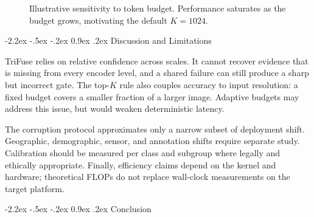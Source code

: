 \documentclass[10pt,twocolumn,letterpaper]{article}
\makeatletter
\newcommand{\method}{TriFuse}
\renewcommand\section{\@startsection{section}{1}{\z@}%
  {-2.2ex \@plus -.5ex \@minus -.2ex}%
  {0.9ex \@plus .2ex}%
  {\normalfont\large\bfseries\color{iccvblue}}}
\makeatother
\begin{document}
\begin{figure}[t]
\centering
{}
\caption{Illustrative sensitivity to token budget. Performance saturates as
the budget grows, motivating the default $K=1024$.}
\label{fig:budget}
\end{figure}

\section{Discussion and Limitations}
\label{sec:limitations}

\method{} relies on relative confidence across scales. It cannot recover evidence
that is missing from every encoder level, and a shared failure can still produce
a sharp but incorrect gate. The top-$K$ rule also couples accuracy to input
resolution: a fixed budget covers a smaller fraction of a larger image.
Adaptive budgets may address this issue, but would weaken deterministic latency.

The corruption protocol approximates only a narrow subset of deployment shift.
Geographic, demographic, sensor, and annotation shifts require separate study.
Calibration should be measured per class and subgroup where legally and
ethically appropriate. Finally, efficiency claims depend on the kernel and
hardware; theoretical FLOPs do not replace wall-clock measurements on the
target platform.

\section{Conclusion}
\label{sec:conclusion}
\end{document}
